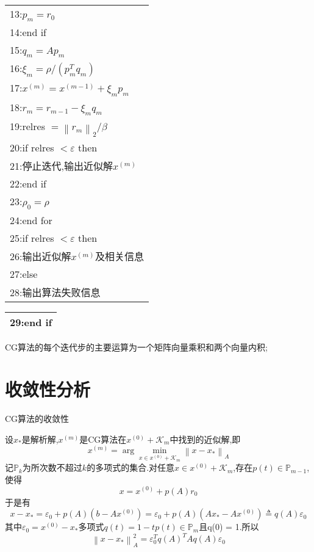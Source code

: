 \documentclass[notheorems,serif]{beamer}
\renewcommand{\normalsize}{\wuhao}
\newcommand{\wuhao}{\fontsize{10.5pt}{\baselineskip}\selectfont}
\begin{document}
\begin{frame}
\begin{tabular}{l}
	13:\qquad \qquad $p_{m}=r_{0}$\\
	14:\qquad end if\\
	15:\qquad $q_{m}=A p_{m}$\\
	16:\qquad $\xi_{m}=\rho /\left(p_{m}^{T} q_{m}\right)$\\
	17:\qquad $x^{(m)}=x^{(m-1)}+\xi_{m} p_{m}$\\
	18:\qquad $r_{m}=r_{m-1}-\xi_{m} q_{m}$\\
	19:\qquad relres $=\left\|r_{m}\right\|_{2} / \beta$\\
	20:\qquad if relres $<\varepsilon$ then\\
	21:\qquad \qquad 停止迭代,输出近似解$x^{(m)}$\\
	22:\qquad end if\\
	23:\qquad $\rho_{0}=\rho$\\
	24:end for\\
	25:if relres $<\varepsilon$ then\\
	26:\qquad 输出近似解$x^{(m)}$及相关信息\\
	27:else\\
	28:\qquad 输出算法失败信息
\end{tabular}
\end{frame}

\begin{frame}
\begin{tabular}{l}
	29:end if\\
	\hline
\end{tabular}
CG算法的每个迭代步的主要运算为一个矩阵向量乘积和两个向量内积;
\end{frame}

\section{收敛性分析}
\begin{frame}


{\color{blue}\Large CG算法的收敛性}

\quad

\normalsize
设$x_{*}$是解析解,$x^{(m)}$是CG算法在$x^{(0)}+\mathcal{K}_{m}$中找到的近似解,即
$$
x^{(m)}=\arg \min _{x \in x^{(0)}+\mathcal{K}_{m}}\left\|x-x_{*}\right\|_{A}
$$
记$\mathbb{P}_{k}$为所次数不超过$k$的多项式的集合.对任意$x \in x^{(0)}+\mathcal{K}_{m}$,存在$p(t) \in \mathbb{P}_{m-1}$,使得
$$
x=x^{(0)}+p(A) r_{0}
$$
于是有
$$
x-x_{*}=\varepsilon_{0}+p(A)\left(b-A x^{(0)}\right)=\varepsilon_{0}+p(A)\left(A x_{*}-A x^{(0)}\right) \triangleq q(A) \varepsilon_{0}
$$
其中$\varepsilon_{0}=x^{(0)}-x_{*}$多项式$q(t)=1-t p(t) \in \mathbb{P}_{m}$且q(0) = 1.所以
$$
\left\|x-x_{*}\right\|_{A}^{2}=\varepsilon_{0}^{T} q(A)^{T} A q(A) \varepsilon_{0}
$$
\end{frame}
\end{document}
